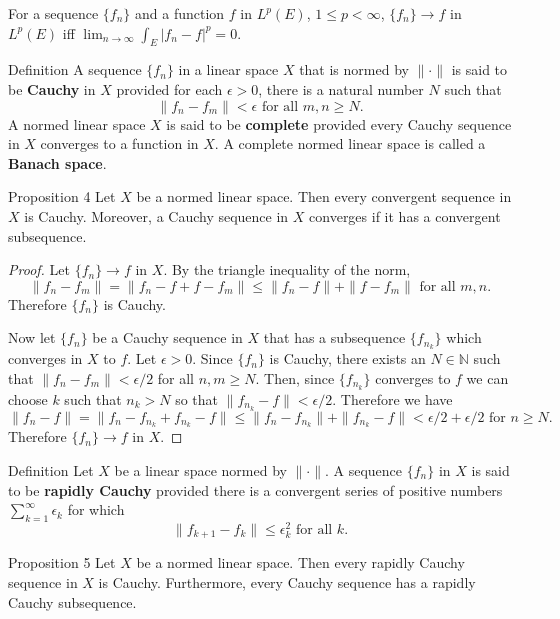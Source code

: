 For a sequence $\{f_n\}$ and a function $f$ in $L^p(E)$, $1\le p<\infty$, $\{f_n\}\to f$ in $L^p(E)$ iff $\lim_{n\to\infty}\int_E|f_n-f|^p=0.$
\begin{namedthm*}{Definition}
	A sequence $\{f_n\}$ in a linear space $X$ that is normed by $\|\cdot\|$ is said to be \textbf{Cauchy} in $X$ provided for each $\epsilon>0$, there is a natural number $N$ such that
	\[
		\|f_n-f_m\|<\epsilon\text{ for all }m,n\ge N.
	\]
	A normed linear space $X$ is said to be \textbf{complete} provided every Cauchy sequence in $X$ converges to a function in $X$.
	A complete normed linear space is called a \textbf{Banach space}.
\end{namedthm*}
\begin{namedthm*}{Proposition 4}
	Let $X$ be a normed linear space.
	Then every convergent sequence in $X$ is Cauchy.
	Moreover, a Cauchy sequence in $X$ converges if it has a convergent subsequence.
\end{namedthm*}
\begin{proof}
	Let $\{f_n\}\to f$ in $X$.
	By the triangle inequality of the norm,
	\[
		\|f_n-f_m\|=\|f_n-f+f-f_m\|\le\|f_n-f\|+\|f-f_m\|\text{ for all }m,n.
	\]
	Therefore $\{f_n\}$ is Cauchy.

	Now let $\{f_n\}$ be a Cauchy sequence in $X$ that has a subsequence $\{f_{n_k}\}$ which converges in $X$ to $f$.
	Let $\epsilon>0$.
	Since $\{f_n\}$ is Cauchy, there exists an $N\in\mathbb{N}$ such that $\|f_n-f_m\|<\epsilon/2$ for all $n,m\ge N$.
	Then, since $\{f_{n_k}\}$ converges to $f$ we can choose $k$ such that $n_k>N$ so that $\|f_{n_k}-f\|<\epsilon/2$.
	Therefore we have
	\[
		\|f_n-f\|=\|f_n-f_{n_k}+f_{n_k}-f\|\le\|f_n-f_{n_k}\|+\|f_{n_k}-f\|<\epsilon/2+\epsilon/2\text{ for }n\ge N.
	\]
	Therefore $\{f_n\}\to f$ in $X$.
\end{proof}
\begin{namedthm*}{Definition}
	Let $X$ be a linear space normed by $\|\cdot\|$.
	A sequence $\{f_n\}$ in $X$ is said to be \textbf{rapidly Cauchy} provided there is a convergent series of positive numbers $\sum_{k=1}^\infty\epsilon_k$ for which 
	\[
		\|f_{k+1}-f_k\|\le\epsilon_k^2\text{ for all }k.
	\]
\end{namedthm*}
\begin{namedthm*}{Proposition 5}
	Let $X$ be a normed linear space.
	Then every rapidly Cauchy sequence in $X$ is Cauchy.
	Furthermore, every Cauchy sequence has a rapidly Cauchy subsequence.
\end{namedthm*}
